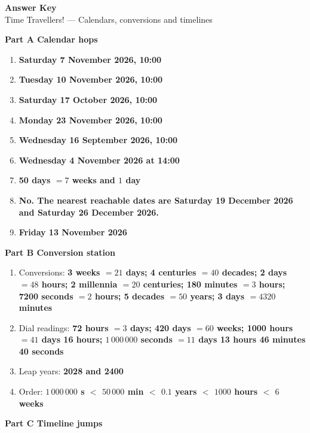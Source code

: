 \documentclass[11pt,a4paper]{article}
\newcommand{\banner}[1]{{\color{ttdark}\large\bfseries #1}\par\vspace{-4pt}{\color{ttdark}\rule{\linewidth}{1pt}}\par\vspace{2pt}}
\newcommand{\ans}[1]{\textcolor{ttaccent}{\bfseries #1}}
\begin{document}
\begin{center}
{\LARGE\bfseries Answer Key}\\[2pt]
{\large Time Travellers! --- Calendars, conversions and timelines}
\end{center}

\banner{Part A \quad Calendar hops}

\begin{enumerate}[label=\textbf{A\arabic*.}, leftmargin=*, itemsep=3pt]
\item \ans{Saturday 7 November 2026, 10:00}
\item \ans{Tuesday 10 November 2026, 10:00}
\item \ans{Saturday 17 October 2026, 10:00}
\item \ans{Monday 23 November 2026, 10:00}
\item \ans{Wednesday 16 September 2026, 10:00}
\item \ans{Wednesday 4 November 2026 at 14:00}
\item \ans{50 days $=7$ weeks and $1$ day}
\item \ans{No. The nearest reachable dates are Saturday 19 December 2026 and Saturday 26 December 2026.}
\item \ans{Friday 13 November 2026}
\end{enumerate}

\banner{Part B \quad Conversion station}

\begin{enumerate}[label=\textbf{B\arabic*.}, leftmargin=*, itemsep=3pt]
\item Conversions: \ans{3 weeks $=21$ days; 4 centuries $=40$ decades; 2 days $=48$ hours; 2 millennia $=20$ centuries; 180 minutes $=3$ hours; 7200 seconds $=2$ hours; 5 decades $=50$ years; 3 days $=4320$ minutes}
\item Dial readings: \ans{72 hours $=3$ days; 420 days $=60$ weeks; 1000 hours $=41$ days 16 hours; $1\,000\,000$ seconds $=11$ days 13 hours 46 minutes 40 seconds}
\item Leap years: \ans{2028 and 2400}
\item Order: \ans{$1\,000\,000$ s $<$ $50\,000$ min $<$ $0.1$ years $<$ $1000$ hours $<$ $6$ weeks}
\end{enumerate}

\banner{Part C \quad Timeline jumps}
\end{document}
